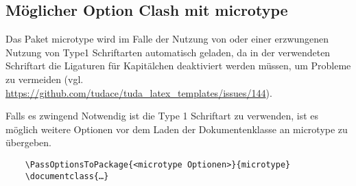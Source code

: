 \documentclass[
	german,
	accentcolor=9c,%
	]{tudapub}
\let\pck\textsf
\begin{document}
\subsection{Möglicher Option Clash mit microtype}
Das Paket \pck{microtype} wird im Falle der Nutzung von  oder einer erzwungenen Nutzung von Type1 Schriftarten automatisch geladen, da in der verwendeten Schriftart die Ligaturen für Kapitälchen deaktiviert werden müssen, um Probleme zu vermeiden (vgl. \url{https://github.com/tudace/tuda_latex_templates/issues/144}).

Falls es zwingend Notwendig ist die Type 1 Schriftart zu verwenden, ist es möglich weitere Optionen vor dem Laden der Dokumentenklasse an \pck{microtype} zu übergeben.

\begin{verbatim}
	\PassOptionsToPackage{<microtype Optionen>}{microtype}
	\documentclass{…}
\end{verbatim}
\appendix
\printbibliography
\end{document}

